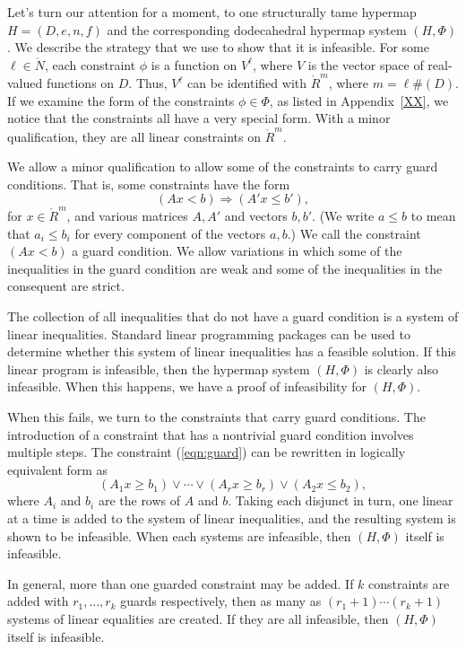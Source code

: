 Let's turn our attention for a moment, to one structurally tame hypermap $H=(D,e,n,f)$ and the corresponding dodecahedral hypermap system $(H,\Phi)$.
We describe the strategy that we use to show that it is infeasible.
For some $\ell\in\ring{N}$,
each constraint $\phi$ is a function on $V^\ell$, where $V$ is
the vector space of real-valued functions on $D$.  Thus,
$V^\ell$ can be identified with $\ring{R}^m$, where $m= \ell \#(D)$.
If we examine the form of the constraints $\phi\in \Phi$, as listed
in Appendix~\ref{XX}, we notice that the constraints all have a 
very special form.  With a minor qualification, they are all linear constraints
on $\ring{R}^m$.  

We allow a minor qualification to allow some of the constraints
to carry guard conditions.  That is, some constraints have the form
  \begin{equation}\label{eqn:guard}
  (A x < b)  \Rightarrow (A' x \le b'),
  \end{equation}
for $x\in\ring{R}^m$, and various matrices $A,A'$ and vectors
$b,b'$.  (We write $a \le b$ to mean
that $a_i\le b_i$ for every component of the vectors $a,b$.)
We call the constraint $(A x < b)$ a guard condition.
We allow variations in which some of the inequalities in the
guard condition are weak and some of the inequalities in the
consequent are strict.

The collection of all inequalities that do not have a guard 
condition is a system of linear inequalities.  Standard linear
programming packages can be used to determine whether this
system of linear inequalities has a feasible solution.  If this
linear program is infeasible, then the hypermap system $(H,\Phi)$
is clearly also infeasible.  When this happens, we have a
proof of infeasibility for $(H,\Phi)$.

When this fails, we turn to the constraints that carry guard
conditions.
The introduction of a constraint that has a nontrivial guard condition
involves multiple steps.  
The constraint (\ref{eqn:guard}) can be rewritten in logically
equivalent form as
  $$
   (A_{1} x \ge b_{1}) \lor \cdots \lor
   (A_{r} x \ge b_{r}) \lor (A_2 x \le b_2),
  $$
where $A_{i}$ and $b_{i}$ are the rows of $A$ and $b$.
Taking each disjunct in turn, one linear at a time
is added to the system
of linear inequalities, and the resulting system is shown to be
infeasible.  When each
systems are infeasible, then $(H,\Phi)$ itself is infeasible.

In general, more than one guarded constraint may be added.  If
$k$ constraints are added with $r_1,\ldots,r_k$ guards
respectively, then as many as $(r_1+1)\cdots (r_k+1)$ systems
of linear equalities are created.  If they are all infeasible,
then $(H,\Phi)$ itself is infeasible.

